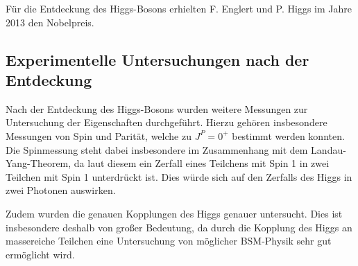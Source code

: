 Für die Entdeckung des Higgs-Bosons erhielten F. Englert und P. Higgs im Jahre 2013 den Nobelpreis.

\subsection{Experimentelle Untersuchungen nach der Entdeckung}
Nach der Entdeckung des Higgs-Bosons wurden weitere Messungen zur Untersuchung der Eigenschaften durchgeführt.
Hierzu gehören insbesondere Messungen von Spin und Parität, welche zu $J^P = 0^+$ bestimmt werden konnten.
Die Spinmessung steht dabei insbesondere im Zusammenhang mit dem Landau-Yang-Theorem, da laut diesem ein Zerfall eines Teilchens mit Spin 1 in zwei Teilchen mit Spin 1 unterdrückt ist.
Dies würde sich auf den Zerfalls des Higgs in zwei Photonen auswirken.

Zudem wurden die genauen Kopplungen des Higgs genauer untersucht. 
Dies ist insbesondere deshalb von großer Bedeutung, da durch die Kopplung des Higgs an massereiche Teilchen eine Untersuchung von möglicher BSM-Physik sehr gut ermöglicht wird.
